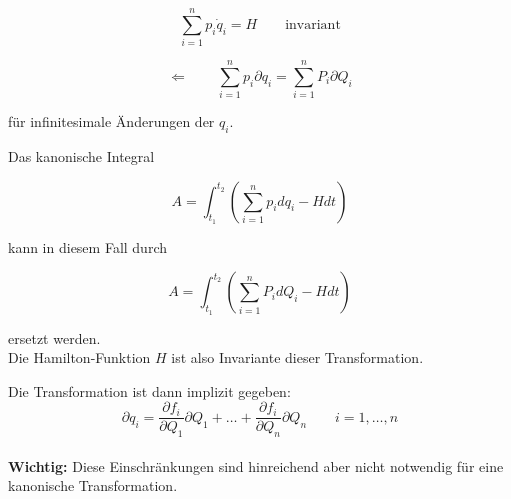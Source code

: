 \begin{frame}
    \begin{displaymath}
    \sum_{i=1}^n p_i \dot{q}_i = H \qquad \text{invariant}
    \end{displaymath}
    
    \begin{displaymath}
    \Longleftarrow \qquad \sum_{i=1}^n p_i \partial q_i = \sum_{i=1}^n P_i \partial Q_i
    \end{displaymath}
    
    für infinitesimale Änderungen der $q_i$.
    
\end{frame}

\begin{frame}
    Das kanonische Integral 
    
    \begin{displaymath}
    A = \int_{t_1}^{t_2} \left( \sum_{i=1}^n p_i dq_i - H dt \right) 
    \end{displaymath}
    
    kann in diesem Fall durch
    
    \begin{displaymath}
    A = \int_{t_1}^{t_2} \left( \sum_{i=1}^n P_i dQ_i - H dt \right) 
    \end{displaymath}
    
    ersetzt werden. \\
    \vspace{5mm}
    Die Hamilton-Funktion $H$ ist also Invariante dieser Transformation.
    
\end{frame}


\begin{frame}
   Die Transformation ist dann implizit gegeben:\\

    \begin{displaymath}
        \partial q_i = \frac{\partial f_i}{\partial Q_1} \partial Q_1 + \ldots +  \frac{\partial f_i}{\partial Q_n} \partial Q_n \qquad i=1,\ldots,n
    \end{displaymath} \\
   \vspace{5mm}      
    \textbf{Wichtig:} Diese Einschränkungen sind hinreichend aber nicht notwendig für eine kanonische Transformation.
\end{frame}